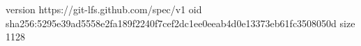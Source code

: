 version https://git-lfs.github.com/spec/v1
oid sha256:5295e39ad5558e2fa189f2240f7cef2dc1ee0eeab4d0e13373eb61fc3508050d
size 1128
